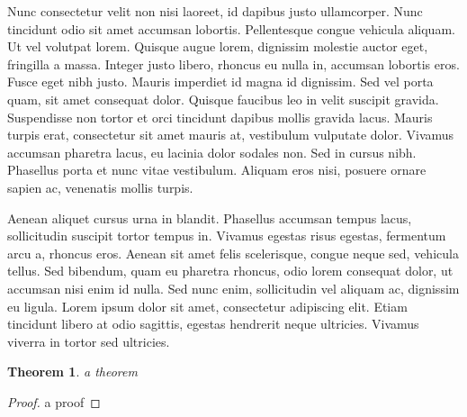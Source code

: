 \documentclass[11pt]{personal} %
\theoremstyle{plain}
\newtheorem{thm}[defn]{Theorem}
\theoremstyle{remark}
\begin{document}
Nunc consectetur velit non nisi laoreet, id dapibus justo ullamcorper. Nunc tincidunt odio sit amet accumsan lobortis. Pellentesque congue vehicula aliquam. Ut vel volutpat lorem. Quisque augue lorem, dignissim molestie auctor eget, fringilla a massa. Integer justo libero, rhoncus eu nulla in, accumsan lobortis eros. Fusce eget nibh justo. Mauris imperdiet id magna id dignissim. Sed vel porta quam, sit amet consequat dolor. Quisque faucibus leo in velit suscipit gravida. Suspendisse non tortor et orci tincidunt dapibus mollis gravida lacus. Mauris turpis erat, consectetur sit amet mauris at, vestibulum vulputate dolor. Vivamus accumsan pharetra lacus, eu lacinia dolor sodales non. Sed in cursus nibh. Phasellus porta et nunc vitae vestibulum. Aliquam eros nisi, posuere ornare sapien ac, venenatis mollis turpis.

Aenean aliquet cursus urna in blandit. Phasellus accumsan tempus lacus, sollicitudin suscipit tortor tempus in. Vivamus egestas risus egestas, fermentum arcu a, rhoncus eros. Aenean sit amet felis scelerisque, congue neque sed, vehicula tellus. Sed bibendum, quam eu pharetra rhoncus, odio lorem consequat dolor, ut accumsan nisi enim id nulla. Sed nunc enim, sollicitudin vel aliquam ac, dignissim eu ligula. Lorem ipsum dolor sit amet, consectetur adipiscing elit. Etiam tincidunt libero at odio sagittis, egestas hendrerit neque ultricies. Vivamus viverra in tortor sed ultricies. 

\begin{thm}
a theorem
\end{thm}

\begin{proof}
a proof
\end{proof}


\cite{liu}
\cite{faithfulaction}


\end{document}
